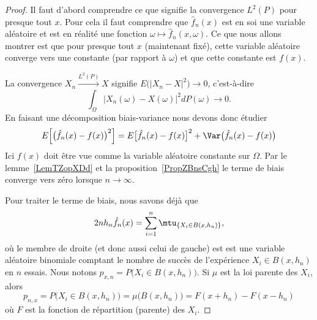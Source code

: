 \begin{proof}
	Il faut d'abord comprendre ce que signifie la convergence \( L^2(P)\) pour presque tout \( x\). Pour cela il faut comprendre que \( \hat f_n(x)\) est en soi une variable aléatoire et est en réalité une fonction \( \omega\mapsto \hat f_n(x,\omega)\). Ce que nous allons montrer est que pour presque tout \( x\) (maintenant fixé), cette variable aléatoire converge vers une constante (par rapport à \( \omega\)) et que cette constante est \( f(x)\).

	La convergence \( X_n\stackrel{L^2(P)}{\to}X\) signifie \( E\big( | X_n-X |^2 \big)\to 0\), c'est-à-dire
	\begin{equation}
		\int_{\Omega}\big| X_n(\omega)-X(\omega) \big|^2dP(\omega)\to 0.
	\end{equation}
	En faisant une décomposition biais-variance nous devons donc étudier
	\begin{equation}
		E\Big[ \big( \hat f_n(x)-f(x) \big)^2 \Big]=E\big[ \hat f_n(x)-f(x) \big]^2+\Var\big( \hat f_n(x)-f(x) \big)
	\end{equation}
	Ici \( f(x)\) doit être vue comme la variable aléatoire constante sur \( \Omega\). Par le lemme~\ref{LemTZopXDd} et la proposition~\ref{PropZBnsCgh} le terme de biais converge vers zéro lorsque \( n\to \infty\).

	Pour traiter le terme de biais, nous savons déjà que
	\begin{equation}
		2nh_n\hat f_n(x)=\sum_{i=1}^n\mtu_{\{ X_i\in B(x,h_n) \}},
	\end{equation}
	où le membre de droite (et donc aussi celui de gauche) est est une variable aléatoire binomiale comptant le nombre de succès de l'expérience \( X_i\in B(x,h_n)\) en \( n\) essais. Nous notons \( p_{x,n}=P\big( X_i\in B(x,h_n) \big)\). Si \( \mu\) est la loi parente des \( X_i\), alors
	\begin{equation}    \label{EqKBKrSHJ}
		p_{n,x}=P\big( X_i\in B(x,h_n) \big)=\mu\big( B(x,h_n) \big)=F(x+h_n)-F(x-h_n)
	\end{equation}
	où \( F\) est la fonction de répartition (parente) des \( X_i\).


\end{proof}

